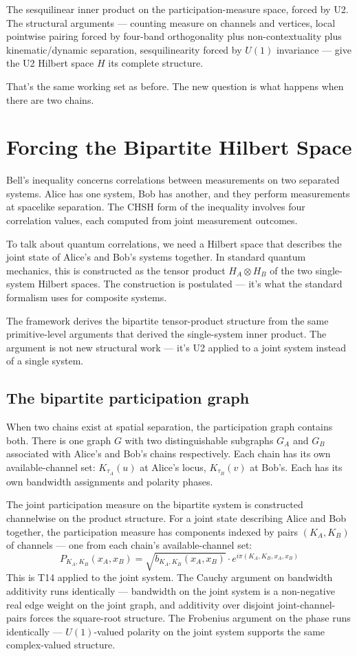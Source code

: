 \documentclass[11pt,a4paper]{article}
\begin{document}
The sesquilinear inner product on the participation-measure space, forced by U2. The structural arguments --- counting measure on channels and vertices, local pointwise pairing forced by four-band orthogonality plus non-contextuality plus kinematic/dynamic separation, sesquilinearity forced by $U(1)$ invariance --- give the U2 Hilbert space $H$ its complete structure.

That's the same working set as before. The new question is what happens when there are two chains.

\section{Forcing the Bipartite Hilbert Space}

Bell's inequality concerns correlations between measurements on two separated systems. Alice has one system, Bob has another, and they perform measurements at spacelike separation. The CHSH form of the inequality involves four correlation values, each computed from joint measurement outcomes.

To talk about quantum correlations, we need a Hilbert space that describes the joint state of Alice's and Bob's systems together. In standard quantum mechanics, this is constructed as the tensor product $H_A \otimes H_B$ of the two single-system Hilbert spaces. The construction is postulated --- it's what the standard formalism uses for composite systems.

The framework derives the bipartite tensor-product structure from the same primitive-level arguments that derived the single-system inner product. The argument is not new structural work --- it's U2 applied to a joint system instead of a single system.

\subsection{The bipartite participation graph}

When two chains exist at spatial separation, the participation graph contains both. There is one graph $G$ with two distinguishable subgraphs $G_A$ and $G_B$ associated with Alice's and Bob's chains respectively. Each chain has its own available-channel set: $K_{\tau_A}(u)$ at Alice's locus, $K_{\tau_B}(v)$ at Bob's. Each has its own bandwidth assignments and polarity phases.

The joint participation measure on the bipartite system is constructed channelwise on the product structure. For a joint state describing Alice and Bob together, the participation measure has components indexed by pairs $(K_A, K_B)$ of channels --- one from each chain's available-channel set:
\[
P_{K_A, K_B}(x_A, x_B) = \sqrt{b_{K_A, K_B}(x_A, x_B)} \cdot e^{i\pi(K_A, K_B, x_A, x_B)}
\]
This is T14 applied to the joint system. The Cauchy argument on bandwidth additivity runs identically --- bandwidth on the joint system is a non-negative real edge weight on the joint graph, and additivity over disjoint joint-channel-pairs forces the square-root structure. The Frobenius argument on the phase runs identically --- $U(1)$-valued polarity on the joint system supports the same complex-valued structure.
\end{document}

